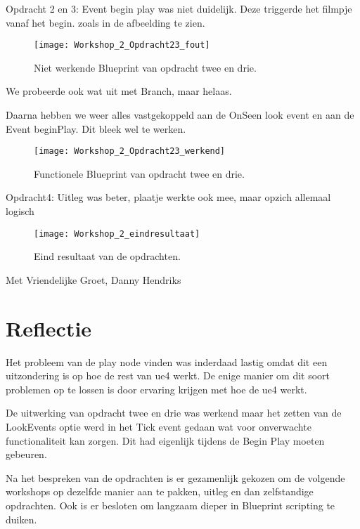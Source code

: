 Opdracht 2 en 3: Event begin play was niet duidelijk. Deze triggerde het filmpje vanaf het begin.
zoals in de afbeelding te zien.

\begin{figure}[!ht]
  \centering
    \texttt{[image: Workshop\_2\_Opdracht23\_fout]}
    \caption{Niet werkende Blueprint van opdracht twee en drie.}
\end{figure}

We probeerde ook wat uit met Branch, maar helaas.

Daarna hebben we weer alles vastgekoppeld aan de OnSeen look event en aan de Event beginPlay. Dit bleek wel te werken.

\begin{figure}[!ht]
  \centering
    \texttt{[image: Workshop\_2\_Opdracht23\_werkend]}
    \caption{Functionele Blueprint van opdracht twee en drie.}
\end{figure}


Opdracht4: Uitleg was beter, plaatje werkte ook mee, maar opzich allemaal logisch

\begin{figure}[!ht]
  \centering
    \texttt{[image: Workshop\_2\_eindresultaat]}
    \caption{Eind resultaat van de opdrachten.}
\end{figure}

Met Vriendelijke Groet,
Danny Hendriks 

\section{Reflectie}
Het probleem van de play node vinden was inderdaad lastig omdat dit een uitzondering is op hoe de rest van \gls{ue4} werkt. De enige manier om dit soort problemen op te lossen is door ervaring krijgen met hoe de {ue4} werkt.

De uitwerking van opdracht twee en drie was werkend maar het zetten van de LookEvents optie werd in het Tick event gedaan wat voor onverwachte functionaliteit kan zorgen. Dit had eigenlijk tijdens de Begin Play moeten gebeuren.

Na het bespreken van de opdrachten is er gezamenlijk gekozen om de volgende workshops op dezelfde manier aan te pakken, uitleg en dan zelfstandige opdrachten. Ook is er besloten om langzaam dieper in Blueprint scripting te duiken.

